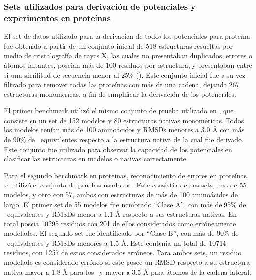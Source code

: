 \subsubsection{Sets utilizados para derivación de potenciales y experimentos en proteínas}
\par
El set de datos utilizado para la derivación de todos los potenciales para proteína fue obtenido a 
partir de un conjunto inicial de 518 estructuras resueltas por medio de cristalografía de rayos X, 
las cuales no presentaban duplicados, errores o átomos faltantes, poseian más de 100 residuos por 
estructura, y presentaban entre si una similitud de secuencia menor al 25\% (\cite{Ferrada2009}). 
Este conjunto inicial fue a su vez filtrado para remover todas las proteínas con más de una 
cadena, dejando 267 estructuras monoméricas, a fin de simplificar la derivación de los potenciales.
\par
El primer benchmark utilizó el mismo conjunto de prueba utilizado en \cite{Ferrada2007}, que 
consiste en un set de 152 modelos y 80 estructuras nativas monoméricas. 
Todos los modelos tenían más de 100 aminoácidos y RMSDs menores a 3.0 \si{\angstrom} con más 
de 90\% de \Ca\ equivalentes respecto a la estructura nativa de la cual fue derivado. 
Este conjunto fue utilizado para observar la capacidad de los potenciales en clasificar las 
estructuras en modelos o nativas correctamente.
\par
Para el segundo benchmark en proteínas, reconocimiento de errores en proteínas, se utilizó el 
conjunto de pruebas usado en \cite{Ferrada2009}.
Este consistía de dos sets, uno de 55 modelos, y otro con 57, ambos con estructuras de más 
de 100 aminoácidos de largo. 
El primer set de 55 modelos fue nombrado ``Clase A'', con más de 95\% de \Ca\ 
equivalentes y RMSDs menor a 1.1 \si{\angstrom} respecto a sus estructuras nativas. 
En total poseía 10295 residuos con 201 de ellos considerados como erróneamente modelados. 
El segundo set fue identificado por ``Clase B'', con más de 90\% de \Ca\ 
equivalentes y RMSDs menores a 1.5 \si{\angstrom}.
Este contenía un total de 10714 residuos, con 1257 de estos considerados erróneos. 
Para ambos sets, un residuo modelado es considerado erróneo si este posee un RMSD respecto 
a su estructura nativa mayor a 1.8 \si{\angstrom} para los \Ca\ y mayor a 
3.5 \si{\angstrom} para átomos de la cadena lateral.

